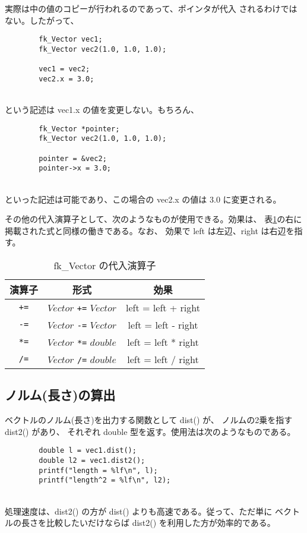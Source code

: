 実際は中の値のコピーが行われるのであって、ポインタが代入
されるわけではない。したがって、
\\
\begin{screen}
\begin{verbatim}
        fk_Vector vec1;
        fk_Vector vec2(1.0, 1.0, 1.0);

        vec1 = vec2;
        vec2.x = 3.0;
\end{verbatim}
\end{screen}
~ \\
という記述は vec1.x の値を変更しない。もちろん、
\\
\begin{screen}
\begin{verbatim}
        fk_Vector *pointer;
        fk_Vector vec2(1.0, 1.0, 1.0);

        pointer = &vec2;
        pointer->x = 3.0;
\end{verbatim}
\end{screen}
~ \\
といった記述は可能であり、この場合の vec2.x の値は 3.0 に変更される。

その他の代入演算子として、次のようなものが使用できる。効果は、
表\ref{tbl:fkVec2}の右に掲載された式と同様の働きである。なお、
効果で left は左辺、right は右辺を指す。
\begin{table}[H]
\caption{fk\_Vector の代入演算子}
\label{tbl:fkVec2}
\begin{center}
\begin{tabular}{|c|c|c|}
\hline
演算子 & 形式 & 効果 \\ \hline \hline
\verb-+=- & \(Vector\) \verb-+=- \(Vector\) &
	left = left + right \\ \hline
\verb+-=+ & \(Vector\) \verb+-=+ \(Vector\) &
	left = left - right \\ \hline
\verb+*=+ & \(Vector\) \verb+*=+ \(double\) &
	left = left * right \\ \hline
\verb+/=+ & \(Vector\) \verb+/=+ \(double\) &
	left = left / right \\ \hline
\end{tabular}
\end{center}
\end{table}

\subsection{ノルム(長さ)の算出}
ベクトルのノルム(長さ)を出力する関数として dist() が、
ノルムの2乗を指す dist2() があり、
それぞれ double 型を返す。使用法は次のようなものである。
\\
\begin{screen}
\begin{verbatim}
        double l = vec1.dist();
        double l2 = vec1.dist2();
        printf("length = %lf\n", l);
        printf("length^2 = %lf\n", l2);
\end{verbatim}
\end{screen}
~ \\
処理速度は、dist2() の方が dist() よりも高速である。従って、ただ単に
ベクトルの長さを比較したいだけならば dist2() を利用した方が効率的である。

